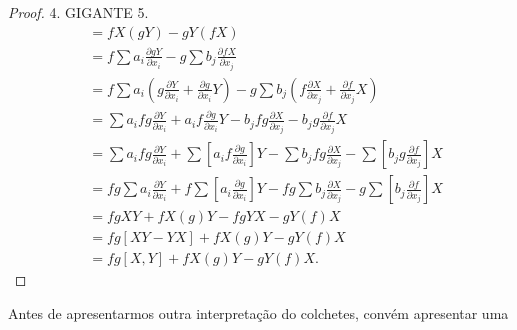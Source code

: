 \begin{proposition}
\begin{proof}
        4. GIGANTE
        5.
        \begin{align*}
            [fX, gY] & = f X(gY) - g Y(fX)                                                                                                                                                                                                       \\
                     & = f \sum a_i \frac{\partial gY}{\partial x_i} - g \sum b_j \frac{\partial fX}{\partial x_j}                                                                                                                               \\
                     & = f \sum a_i \left( g \frac{\partial Y}{\partial x_i} + \frac{\partial g}{\partial x_i} Y \right) - g \sum b_j \left( f \frac{\partial X}{\partial x_j} + \frac{\partial f}{\partial x_j} X \right)                       \\
                     & = \sum a_i f g \frac{\partial Y}{\partial x_i} + a_i f \frac{\partial g}{\partial x_i} Y - b_j f g \frac{\partial X}{\partial x_j} - b_j g \frac{\partial f}{\partial x_j} X                                              \\
                     & = \sum a_i f g \frac{\partial Y}{\partial x_i} + \sum \left[ a_i f \frac{\partial g}{\partial x_i} \right] Y - \sum b_j f g \frac{\partial X}{\partial x_j} - \sum \left[ b_j g \frac{\partial f}{\partial x_j} \right] X \\
                     & = f g \sum a_i \frac{\partial Y}{\partial x_i} + f \sum \left[ a_i \frac{\partial g}{\partial x_i} \right] Y - f g \sum b_j \frac{\partial X}{\partial x_j} - g \sum \left[ b_j \frac{\partial f}{\partial x_j} \right] X \\
                     & = fgXY + fX(g)Y - fgYX - gY(f)X                                                                                                                                                                                           \\
                     & = fg[XY - YX] + fX(g)Y - gY(f)X                                                                                                                                                                                           \\
                     & = fg[X, Y] + fX(g)Y - gY(f)X.
        \end{align*}
    \end{proof}
\end{proposition}
Antes de apresentarmos outra interpretação do colchetes, convém apresentar uma
